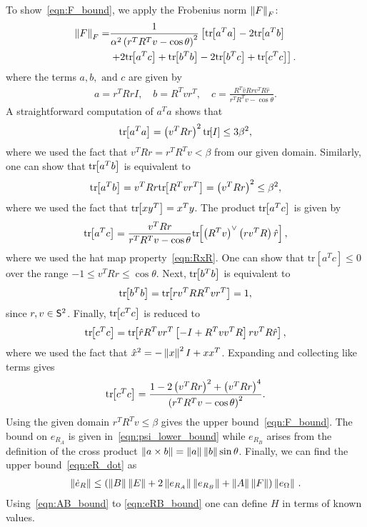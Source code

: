 To show~\cref{eqn:F_bound}, we apply the Frobenius norm \( \left\| F \right\|_F \):
\begin{align*}
	\left\| F \right\|_F =& \frac{1}{\alpha ^2 \left( r^T R^T v - \cos \theta \right)^2} \left[\mathrm{tr}\negthickspace\left[ a^T a \right] - 2 \mathrm{tr}\negthickspace\left[ a^T b \right] \right. \\
	&\left.+ 2 \mathrm{tr}\negthickspace\left[ a^T c  \right] + \mathrm{tr}\negthickspace\left[ b^T b \right]  - 2 \mathrm{tr}\negthickspace\left[ b^T c \right] + \mathrm{tr}\negthickspace\left[ c^T c \right]\right].
\end{align*}
where the terms \( a, b, \text{ and } c \) are given by
\begin{gather*}
	a = r^T R r I , \quad	b = R^T v r^T , \quad c = \frac{R^T \hat{v} R r v^T R \hat{r}}{r^T R^T v - \cos \theta}.
\end{gather*}
A straightforward computation of \( a^T a \) shows that
\begin{gather*}
	\mathrm{tr}\negthickspace\left[ a^T a \right] = \left( v^T R r \right)^2 \mathrm{tr}\negthickspace\left[ I \right] \leq 3 \beta^2 ,
\end{gather*}
where we used the fact that \( v^T R r = r^T R^T v < \beta \) from our given domain.
Similarly, one can show that \( \mathrm{tr}\negthickspace\left[ a^T b \right] \) is equivalent to
\begin{gather*}
	\mathrm{tr}\negthickspace\left[ a^T b \right] = v^T R r \mathrm{tr}\negthickspace\left[ R^T v r^T \right] = \left( v^T R r \right)^2 \leq \beta^2 ,
\end{gather*} 
where we used the fact that \( \mathrm{tr}\negthickspace\left[ x y^T \right] = x^T y \).
The product \( \mathrm{tr}\negthickspace\left[ a^T c \right] \) is given by
\begin{gather*}
	\mathrm{tr}\negthickspace\left[ a^T c \right] = \frac{v^T R r}{r^T R^T v - \cos \theta} \mathrm{tr}\negthickspace\left[ \left( R^T v \right)^\vee \left( r v^T R \right) \hat{r}  \right] ,
\end{gather*}
where we used the hat map property~\cref{eqn:RxR}.
One can show that \(\mathrm{tr}[a^T c] \leq 0 \) over the range \( -1 \leq v^T R r \leq \cos \theta \). 
Next, \( \mathrm{tr}\negthickspace\left[ b^T b \right]\) is equivalent to
\begin{gather*}
	\mathrm{tr}\negthickspace\left[ b^T b \right] = \mathrm{tr}\negthickspace\left[ r v^T R R^T v r^T \right] = 1 ,
\end{gather*}
since \( r,v \in \mathsf{S}^2\).
Finally, \( \mathrm{tr}\negthickspace\left[ c^T c \right] \) is reduced to
\begin{gather*}
	\mathrm{tr}\negthickspace\left[ c^T c \right] = \mathrm{tr}\negthickspace\left[ \hat{r} R^T v r^T \left[ -I + R^T v v^T R \right] r v^T R \hat{r} \right] ,
\end{gather*}
where we used the fact that \( \hat{x}^2 = - \left\| x \right\|^2 I + x x^T\).
Expanding and collecting like terms gives
\begin{gather*}
	\mathrm{tr}\negthickspace\left[ c^T c  \right] = \frac{1 - 2\left( v^T R r \right)^2 + \left( v^T R r \right)^4}{\left( r^T R^T v - \cos \theta \right)^2}. 
\end{gather*}
Using the given domain \( r^T R^T v \leq \beta \) gives the upper bound~\cref{eqn:F_bound}.
The bound on \( e_{R_A} \) is given in~\cref{eqn:psi_lower_bound} while \( e_{R_B} \) arises from the definition of the cross product \( \left\| a \times b \right\| = \left\| a \right\| \left\| b \right\| \sin \theta \).
Finally, we can find the upper bound~\cref{eqn:eR_dot} as
\begin{gather*}
	\left\| \dot{e}_R \right\| \leq \left( \left\| B \right\| \left\| E \right\| + 2 \left\| e_{R_A} \right\| \left\| e_{R_B} \right\| + \left\| A \right\|\left\| F \right\| \right) \left\| e_\Omega \right\| \,.
\end{gather*}
Using~\cref{eqn:AB_bound} to \cref{eqn:eRB_bound} one can define \( H \) in terms of known values.

